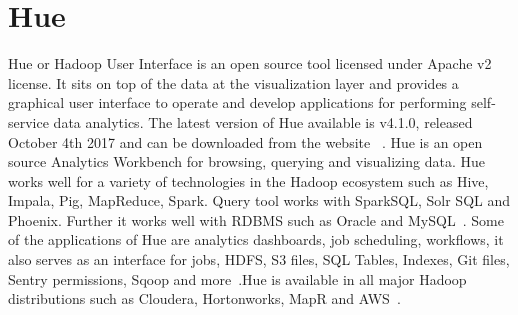 \section{Hue}


Hue or Hadoop User Interface is an open source tool licensed under
Apache v2 license. It sits on top of the data at the visualization
layer and provides a graphical user interface to operate and develop
applications for performing self-service data analytics.  The latest
version of Hue available is v4.1.0, released October 4th 2017 and can
be downloaded from the website ~\cite{hid-sp18-517-hue-apache}. Hue is
an open source Analytics Workbench for browsing, querying and
visualizing data. Hue works well for a variety of technologies in the
Hadoop ecosystem such as Hive, Impala, Pig, MapReduce, Spark. Query
tool works with SparkSQL, Solr SQL and Phoenix. Further it works well
with RDBMS such as Oracle and MySQL~\cite{hid-sp18-517-Hue-wiki}. Some
of the applications of Hue are analytics dashboards, job scheduling,
workflows, it also serves as an interface for jobs, HDFS, S3 files,
SQL Tables, Indexes, Git files, Sentry permissions, Sqoop and
more~\cite{hid-sp18-517-Hue-wiki}.Hue is available in all major Hadoop
distributions such as Cloudera, Hortonworks, MapR and
AWS~\cite{hid-sp18-517-Hue-wiki}.

